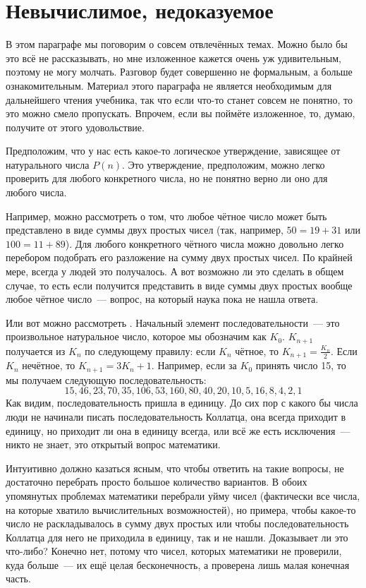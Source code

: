 \section{Невычислимое, недоказуемое}

В этом параграфе мы поговорим о совсем отвлечённых темах. Можно было бы это всё не рассказывать, но мне изложенное кажется очень уж удивительным, поэтому не могу молчать. Разговор будет совершенно не формальным, а больше ознакомительным. Материал этого параграфа не является необходимым для дальнейшего чтения учебника, так что если что-то станет совсем не понятно, то это можно смело пропускать. Впрочем, если вы поймёте изложенное, то, думаю, получите от этого удовольствие.

Предположим, что у нас есть какое-то логическое утверждение, зависящее от натурального числа $P(n)$. Это утверждение, предположим, можно легко проверить для любого конкретного числа, но не понятно верно ли оно для любого числа.

Например, можно рассмотреть  о том, что любое чётное число может быть представлено в виде суммы двух простых чисел (так, например, $50=19+31$ или $100=11+89$). Для любого конкретного чётного числа можно довольно легко перебором подобрать его разложение на сумму двух простых чисел. По крайней мере, всегда у людей это получалось. А вот возможно ли это сделать в общем случае, то есть если получится представить в виде суммы двух простых вообще любое чётное число~— вопрос, на который наука пока не нашла ответа.

Или вот можно рассмотреть . Начальный элемент последовательности~— это произвольное натуральное число, которое мы обозначим как $K_0$. $K_{n+1}$ получается из $K_n$ по следующему правилу: если $K_n$ чётное, то $K_{n+1}=\frac{K_n}{2}$. Если $K_n$ нечётное, то $K_{n+1} = 3K_n  + 1$. Например, если за $K_0$ принять число 15, то мы получаем следующую последовательность:
$$15, 46, 23, 70, 35, 106, 53, 160, 80, 40, 20, 10, 5, 16, 8, 4, 2, 1$$
Как видим, последовательность пришла в единицу. До сих пор с какого бы числа люди не начинали писать последовательность Коллатца, она всегда приходит в единицу, но приходит ли она в единицу всегда, или всё же есть исключения~— никто не знает, это открытый вопрос математики.

Интуитивно должно казаться ясным, что чтобы ответить на такие вопросы, не достаточно перебрать просто большое количество вариантов. В обоих упомянутых проблемах математики перебрали уйму чисел (фактически все числа, на которые хватило вычислительных возможностей), но примера, чтобы какое-то число не раскладывалось в сумму двух простых или чтобы последовательность Коллатца для него не приходила в единицу, так и не нашли. Доказывает ли это что-либо? Конечно нет, потому что чисел, которых математики не проверили, куда больше~— их ещё целая бесконечность, а проверена лишь малая конечная часть.

